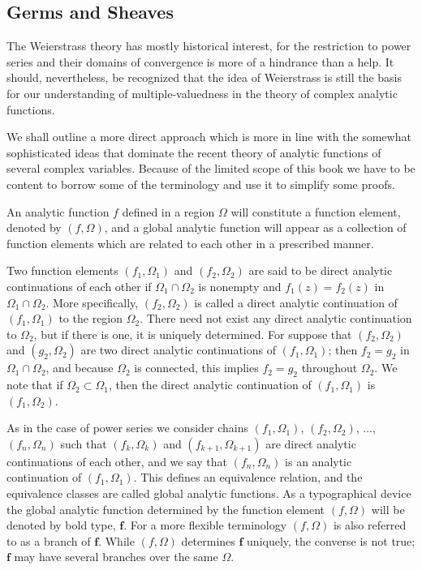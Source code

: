 \setcounter{section}{1}\setcounter{subsection}{1}\subsection{Germs and Sheaves}\label{sec:8.1.2}
The Weierstrass theory has mostly historical interest, for the restriction to power series and their domains of convergence is more of a hindrance than a help. It should, nevertheless, be recognized that the idea of Weierstrass is still the basis for our understanding of multiple-valuedness in the theory of complex analytic functions.

We shall outline a more direct approach which is more in line with the somewhat sophisticated ideas that dominate the recent theory of analytic functions of several complex variables. Because of the limited scope of this book we have to be content to borrow some of the terminology and use it to simplify some proofs.

An analytic function $f$ defined in a region $\Omega$ will constitute a function element, denoted by $(f, \Omega)$, and a global analytic function will appear as a
collection of function elements which are related to each other in a prescribed manner.

Two function elements $(f_{1},\Omega_{1})$ and $(f_{2},\Omega_{2})$ are said to be direct analytic continuations of each other if $\Omega_{1}\cap\Omega_{2}$ is nonempty and $f_{1}(z)=f_{2}(z)$ in $\Omega_{1}\cap\Omega_{2}$. More specifically, $(f_{2},\Omega_{2})$ is called a direct analytic continuation of $(f_{1},\Omega_{1})$ to the region $\Omega_{2}$. There need not exist any direct analytic continuation to $\Omega_{2}$, but if there is one, it is uniquely determined. For suppose that $(f_{2},\Omega_{2})$ and $(g_{2},\Omega_{2})$ are two direct analytic continuations of $(f_{1},\Omega_{1})$; then $f_{2}=g_{2}$ in $\Omega_{1}\cap\Omega_{2}$, and because $\Omega_{2}$ is connected, this implies $f_{2}=g_{2}$ throughout $\Omega_{2}$. We note that if $\Omega_{2}\subset\Omega_{1}$, then the direct analytic continuation of $(f_{1},\Omega_{1})$ is $(f_{1},\Omega_{2})$.

As in the case of power series we consider chains $(f_{1},\Omega_{1})$, $(f_{2},\Omega_{2})$, $\ldots$, $(f_{n},\Omega_{n})$ such that $(f_{k},\Omega_{k})$ and $(f_{k+1},\Omega_{k+1})$ are direct analytic continuations of each other, and we say that $(f_{n},\Omega_{n})$ is an analytic continuation of $(f_{1},\Omega_{1})$. This defines an equivalence relation, and the equivalence classes are called global analytic functions. As a typographical device the global analytic function determined by the function element $(f,\Omega)$ will be denoted by bold type, $\mathbf{f}$. For a more flexible terminology $(f,\Omega)$ is also referred to as a branch of $\mathbf{f}$. While $(f,\Omega)$ determines $\mathbf{f}$ uniquely, the converse is not true; $\mathbf{f}$ may have several branches over the same $\Omega$.

